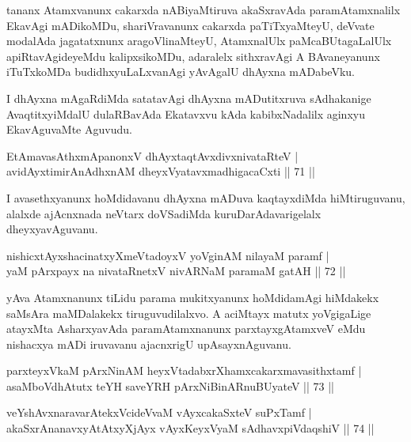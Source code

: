 \begin{artha}
tananx Atamxvanunx cakarxda nABiyaMtiruva akaSxravAda paramAtamxnalilx EkavAgi mADikoMDu, shariVravanunx cakarxda paTiTxyaMteyU, deVvate modalAda jagatatxnunx aragoVlinaMteyU, AtamxnalUlx paMcaBUtagaLalUlx apiRtavAgideyeMdu kalipxsikoMDu, adaralelx sithxravAgi A BAvaneyanunx iTuTxkoMDa budidhxyuLaLxvanAgi yAvAgalU dhAyxna mADabeVku.
\end{artha}



\begin{artha}
I dhAyxna mAgaRdiMda satatavAgi dhAyxna mADutitxruva sAdhakanige AvaqtitxyiMdalU dulaRBavAda Ekatavxvu kAda kabibxNadalilx aginxyu EkavAguvaMte Aguvudu.
\end{artha}

\begin{shl}
EtAmavasAthxmApanonxV dhAyxtaqtAvxdivxnivataRteV |\\
avidAyxtimirAnAdhxnAM dheyxVyatavxmadhigacaCxti \hfill || 71 ||
\end{shl}

\begin{artha}
I avasethxyanunx hoMdidavanu dhAyxna mADuva kaqtayxdiMda hiMtiruguvanu, alalxde ajAcnxnada neVtarx doVSadiMda kuruDarAdavarigelalx dheyxyavAguvanu.
\end{artha}


\begin{shl}
nishicxtAyxshacinatxyXmeVtadoyxV yoVginAM nilayaM paramf |\\
yaM pArxpayx na nivataRnetxV nivARNaM paramaM gatAH \hfill || 72 ||
\end{shl}

\begin{artha}
yAva Atamxnanunx tiLidu parama mukitxyanunx hoMdidamAgi hiMdakekx saMsAra maMDalakekx tiruguvudilalxvo. A aciMtayx matutx yoVgigaLige atayxMta AsharxyavAda paramAtamxnanunx parxtayxgAtamxveV eMdu nishacxya mADi iruvavanu ajacnxrigU upAsayxnAguvanu.
\end{artha}


\begin{shl}
parxteyxVkaM pArxNinAM heyxVtadabxrXhamxcakarxmavasithxtamf |\\
asaMboVdhAtutx teYH saveYRH pArxNiBinARnuBUyateV \hfill || 73 ||
\end{shl}
\begin{shl}
veYshAvxnaravarAtekxVcideVvaM vAyxcakaSxteV suPxTamf |\\
akaSxrAnanavxyAtAtxyXjAyx vAyxKeyxVyaM sAdhavxpiVdaqshiV \hfill || 74 ||
\end{shl}

